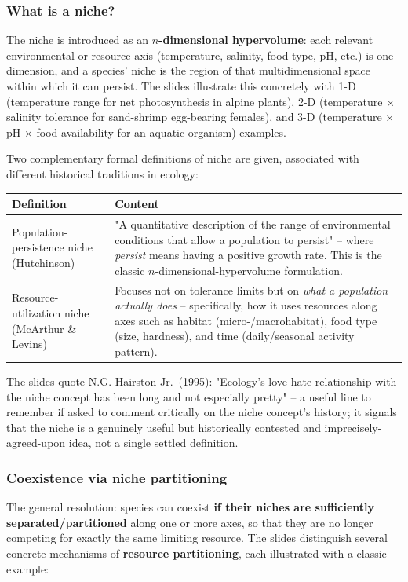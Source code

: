 \documentclass[11pt,a4paper]{article}
\begin{document}
\subsubsection*{What is a niche?}
The niche is introduced as an \textbf{$n$-dimensional hypervolume}: each relevant environmental or resource axis (temperature, salinity, food type, pH, etc.) is one dimension, and a species' niche is the region of that multidimensional space within which it can persist. The slides illustrate this concretely with 1-D (temperature range for net photosynthesis in alpine plants), 2-D (temperature $\times$ salinity tolerance for sand-shrimp egg-bearing females), and 3-D (temperature $\times$ pH $\times$ food availability for an aquatic organism) examples.

Two complementary formal definitions of niche are given, associated with different historical traditions in ecology:
\begin{center}
\begin{tabularx}{\textwidth}{@{}l X@{}}
\toprule
\textbf{Definition} & \textbf{Content} \\
\midrule
Population-persistence niche (Hutchinson) & "A quantitative description of the range of environmental conditions that allow a population to persist" -- where \emph{persist} means having a positive growth rate. This is the classic $n$-dimensional-hypervolume formulation. \\
Resource-utilization niche (McArthur \& Levins) & Focuses not on tolerance limits but on \emph{what a population actually does} -- specifically, how it uses resources along axes such as habitat (micro-/macrohabitat), food type (size, hardness), and time (daily/seasonal activity pattern). \\
\bottomrule
\end{tabularx}
\end{center}

\begin{exambox}
The slides quote N.G. Hairston Jr.\ (1995): "Ecology's love-hate relationship with the niche concept has been long and not especially pretty" -- a useful line to remember if asked to comment critically on the niche concept's history; it signals that the niche is a genuinely useful but historically contested and imprecisely-agreed-upon idea, not a single settled definition.
\end{exambox}

\subsubsection*{Coexistence via niche partitioning}
The general resolution: species can coexist \textbf{if their niches are sufficiently separated/partitioned} along one or more axes, so that they are no longer competing for exactly the same limiting resource. The slides distinguish several concrete mechanisms of \textbf{resource partitioning}, each illustrated with a classic example:
\end{document}
